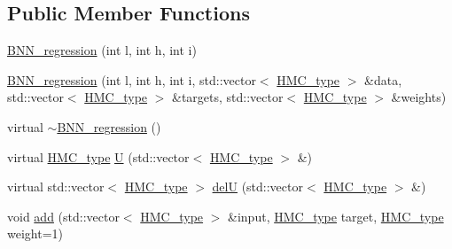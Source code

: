 \subsection*{Public Member Functions}
\begin{DoxyCompactItemize}
\item 
\hyperlink{class_b_n_n__regression_acc1e541db00ddc40d6d1038b3e757f99}{B\-N\-N\-\_\-regression} (int l, int h, int i)
\item 
\hyperlink{class_b_n_n__regression_a0096fd7a59f8b57dea848bf3a8df8c7d}{B\-N\-N\-\_\-regression} (int l, int h, int i, std\-::vector$<$ \hyperlink{define__type_8h_a9adf655d34223b34db3baff5c7ce420c}{H\-M\-C\-\_\-type} $>$ \&data, std\-::vector$<$ \hyperlink{define__type_8h_a9adf655d34223b34db3baff5c7ce420c}{H\-M\-C\-\_\-type} $>$ \&targets, std\-::vector$<$ \hyperlink{define__type_8h_a9adf655d34223b34db3baff5c7ce420c}{H\-M\-C\-\_\-type} $>$ \&weights)
\item 
virtual \hyperlink{class_b_n_n__regression_a6a47225939e7f7b9c33d415f315abc48}{$\sim$\-B\-N\-N\-\_\-regression} ()
\item 
virtual \hyperlink{define__type_8h_a9adf655d34223b34db3baff5c7ce420c}{H\-M\-C\-\_\-type} \hyperlink{class_b_n_n__regression_a57303ef1ca25e08c7489fb5095f23527}{U} (std\-::vector$<$ \hyperlink{define__type_8h_a9adf655d34223b34db3baff5c7ce420c}{H\-M\-C\-\_\-type} $>$ \&)
\item 
virtual std\-::vector$<$ \hyperlink{define__type_8h_a9adf655d34223b34db3baff5c7ce420c}{H\-M\-C\-\_\-type} $>$ \hyperlink{class_b_n_n__regression_a779b2feff8192046b2670e80b88547ba}{del\-U} (std\-::vector$<$ \hyperlink{define__type_8h_a9adf655d34223b34db3baff5c7ce420c}{H\-M\-C\-\_\-type} $>$ \&)
\item 
void \hyperlink{class_b_n_n__regression_aec01e7a9c47f666909699e8e50dad2e4}{add} (std\-::vector$<$ \hyperlink{define__type_8h_a9adf655d34223b34db3baff5c7ce420c}{H\-M\-C\-\_\-type} $>$ \&input, \hyperlink{define__type_8h_a9adf655d34223b34db3baff5c7ce420c}{H\-M\-C\-\_\-type} target, \hyperlink{define__type_8h_a9adf655d34223b34db3baff5c7ce420c}{H\-M\-C\-\_\-type} weight=1)
\end{DoxyCompactItemize}
